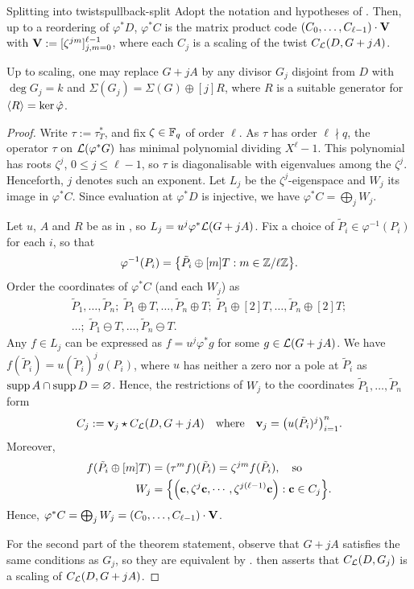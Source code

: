 \documentclass[twocolumn, 11pt]{scrartcl}
\begin{document}
\begin{theorem}{Splitting into twists}{pullback-split}
    Adopt the notation and hypotheses of . Then, up to a reordering of $\varphi^* D$, $\varphi^*C$ is the matrix product code $(C_0,\hdots,C_{\ell-1})\cdot \mathbf{V}$ with $\mathbf{V}:=[\zeta^{jm}]_{j,m=0}^{\ell-1}$, where each $C_j$ is a scaling of the twist $C_\mathcal{L}(D,G+jA)$.

    Up to scaling, one may replace $G+jA$ by any divisor $G_j$ disjoint from $D$ with $\deg G_j=k$ and $\Sigma(G_j)=\Sigma(G)\oplus[j]R$, where $R$ is a suitable generator for $\langle R\rangle=\ker\hat\varphi$.
\end{theorem}

\begin{proof}
    Write $\tau:=\tau_T^*$, and fix $\zeta\in\mathbb{F}_q$ of order $\ell$. As $\tau$ has order $\ell\nmid q$, the operator $\tau$ on $\mathcal{L}(\varphi^*G)$ has minimal polynomial dividing $X^\ell-1$. This polynomial has roots $\zeta^j$, $0\leq j\leq\ell-1$, so $\tau$ is diagonalisable with eigenvalues among the $\zeta^j$. Henceforth, $j$ denotes such an exponent. Let $L_j$ be the $\zeta^j$-eigenspace and $W_j$ its image in $\varphi^*C$. Since evaluation at $\varphi^*D$ is injective, we have $\varphi^*C=\bigoplus_j W_j$.

    Let $u$, $A$ and $R$ be as in , so $L_j=u^j\varphi^*\mathcal{L}(G+jA)$. Fix a choice of $\tilde P_i\in\varphi^{-1}(P_i)$ for each $i$, so that
    \[ \varphi^{-1}(P_i)=\set*{\tilde P_i\oplus[m]T:m\in\bbZ/\ell\bbZ}. \]
    Order the coordinates of $\varphi^*C$ (and each $W_j$) as
    \begin{align*}
    \tilde P_1,\hdots,\tilde P_n;\;\tilde P_1\oplus T,\hdots,\tilde P_n\oplus T;\;
    \tilde P_1\oplus [2]T,\hdots,\tilde P_n\oplus [2]T;\\
    \hdots;\;\tilde P_1\ominus T,\hdots,\tilde P_n\ominus T.
    \end{align*}
    Any $f\in L_j$ can be expressed as $f=u^j\varphi^*g$ for some $g\in\mathcal{L}(G+jA)$. We have $f(\tilde P_i)=u(\tilde P_i)^jg(P_i)$, where $u$ has neither a zero nor a pole at $\tilde P_i$ as $\operatorname{supp} A\cap\operatorname{supp} D=\varnothing$. Hence, the restrictions of $W_j$ to the coordinates $\tilde P_1,\hdots,\tilde P_n$ form
    \[ C_j:=\bfv_j\star C_\mcL(D,G+jA) \qwhr \bfv_j=\pa*{u(\tilde P_i)^j}_{i=1}^n.\]
    Moreover,
    \begin{align*}
        f(\tilde P_i\oplus[m]T)&=(\tau^mf)(\tilde P_i)=\zeta^{jm}f(\tilde P_i),\quad\text{so} \\
        W_j&=\set*{\pa*{\bfc,\zeta^j\bfc,\cdots,\zeta^{j(\ell-1)}\bfc}:\bfc\in C_j}.
    \end{align*}
    Hence, $\varphi^*C=\bigoplus_jW_j=(C_0,\hdots,C_{\ell-1})\cdot\mathbf{V}$.

    For the second part of the theorem statement, observe that $G+jA$ satisfies the same conditions as $G_j$, so they are equivalent by .  then asserts that $C_\mathcal{L}(D,G_j)$ is a scaling of $C_\mathcal{L}(D,G+jA)$.
\end{proof}
\end{document}
